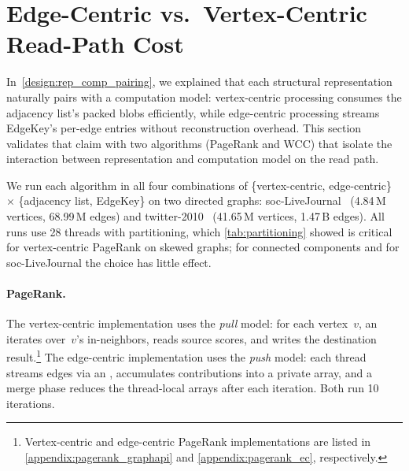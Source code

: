 \section{Edge-Centric vs.\ Vertex-Centric Read-Path Cost}
\label{sec:eval:ec_vc}

In~\autoref{design:rep_comp_pairing}, we explained that each structural representation naturally pairs with a computation model: vertex-centric processing consumes the adjacency list's packed blobs efficiently, while edge-centric processing streams EdgeKey's per-edge entries without reconstruction overhead.
This section validates that claim with two algorithms (PageRank and \ac{WCC}) that isolate the interaction between representation and computation model on the read path.

We run each algorithm in all four combinations of \{vertex-centric, edge-centric\} $\times$ \{adjacency list, EdgeKey\} on two directed graphs: soc-LiveJournal~\cite{socLiveJournal} (4.84\,M vertices, 68.99\,M edges) and twitter-2010~\cite{twitter2010} (41.65\,M vertices, 1.47\,B edges).
All runs use 28 threads with  partitioning, which \autoref{tab:partitioning} showed is critical for vertex-centric PageRank on skewed graphs; for connected components and for soc-LiveJournal the choice has little effect.

\paragraph{PageRank.}
The vertex-centric implementation uses the \emph{pull} model: for each vertex~$v$, an  iterates over~$v$'s in-neighbors, reads source scores, and writes the destination result.\footnote{Vertex-centric and edge-centric PageRank implementations are listed in \autoref{appendix:pagerank_graphapi} and \autoref{appendix:pagerank_ec}, respectively.}
The edge-centric implementation uses the \emph{push} model: each thread streams edges via an , accumulates contributions into a private array, and a merge phase reduces the thread-local arrays after each iteration.
Both run 10 iterations.

